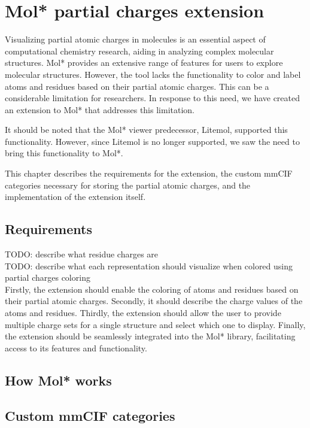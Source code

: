 \documentclass[
  digital,     %
  oneside,     %
  nosansbold,  %
  nocolorbold, %
  lof,         %
  lot,         %
]{fithesis4}
\begin{document}
\chapter{Mol* partial charges extension}
\label{chapter:molstar_partial_charges_extension}

Visualizing partial atomic charges in molecules is an essential aspect of computational chemistry research, aiding in analyzing complex molecular structures. Mol* provides an extensive range of features for users to explore molecular structures. However, the tool lacks the functionality to color and label atoms and residues based on their partial atomic charges.
This can be a considerable limitation for researchers. In response to this need, we have created an extension to Mol* that addresses this limitation.

It should be noted that the Mol* viewer predecessor, Litemol, supported this functionality. However, since Litemol is no longer supported, we saw the need to bring this functionality to Mol*.

This chapter describes the requirements for the extension, the custom mmCIF categories necessary for storing the partial atomic charges, and the implementation of the extension itself.

\section{Requirements}
\label{section:requirements}

TODO: describe what residue charges are \\
TODO: describe what each representation should visualize when colored using partial charges coloring \\

Firstly, the extension should enable the coloring of atoms and residues based on their partial atomic charges. Secondly, it should describe the charge values of the atoms and residues. Thirdly, the extension should allow the user to provide multiple charge sets for a single structure and select which one to display. Finally, the extension should be seamlessly integrated into the Mol* library, facilitating access to its features and functionality.

\section{How Mol* works}

\section{Custom mmCIF categories}
\label{section:custom_mmcif_categories}
\end{document}
